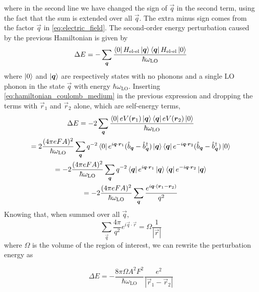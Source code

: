where in the second line we have changed the sign of $\vec{q}$ in the second term, using the fact that the sum is extended over all $\vec{q}$. The extra minus sign comes from the factor $\vec{q}$ in \cref{eq:electric_field}. The second-order energy perturbation caused by the previous Hamiltonian is given by
\begin{equation}
    \Delta E = -\sum_{\mathbf{\boldsymbol{q}}} \frac{\bra{0}H_\text{el-el}\ket{\mathbf{\boldsymbol{q}}}\bra{\mathbf{\boldsymbol{q}}}H_\text{el-el}\ket{0}}{\hbar\omega_\text{LO}}
\end{equation}
where $\ket{0}$ and $\ket{\mathbf{\boldsymbol{q}}}$ are respectively states with no phonons and a single LO phonon in the state $\vec{q}$ with energy $\hbar\omega_\text{LO}$. Inserting \cref{eq:hamiltonian_coulomb_medium} in the previous expression and dropping the terms with $\vec{r}_1$ and $\vec{r}_2$ alone, which are self-energy terms,
\begin{multline}
    \Delta E = -2\sum_{\mathbf{\boldsymbol{q}}} \frac{\bra{0}eV(\mathbf{\boldsymbol{r}}_1)\ket{\mathbf{\boldsymbol{q}}}\bra{\mathbf{\boldsymbol{q}}}eV(\mathbf{\boldsymbol{r}}_2)\ket{0}}{\hbar\omega_\text{LO}}
    \\ = 2 \frac{(4\pi eFA)^2}{\hbar \omega_\text{LO}} \sum_{\mathbf{\boldsymbol{q}}} q^{-2} \bra{0}e^{i\mathbf{\boldsymbol{q}}\cdot\mathbf{\boldsymbol{r}}_1}(\hat{b}_{\mathbf{\boldsymbol{q}}} - \hat{b}^\dagger_{\mathbf{\boldsymbol{q}}})\ket{\mathbf{\boldsymbol{q}}}\bra{\mathbf{\boldsymbol{q}}}e^{-i\mathbf{\boldsymbol{q}}\cdot\mathbf{\boldsymbol{r}}_2}(\hat{b}_{\mathbf{\boldsymbol{q}}} - \hat{b}^\dagger_{\mathbf{\boldsymbol{q}}})\ket{0}
    \\ = - 2 \frac{(4\pi eFA)^2}{\hbar \omega_\text{LO}} \sum_{\mathbf{\boldsymbol{q}}} q^{-2} \bra{\mathbf{\boldsymbol{q}}}e^{i\mathbf{\boldsymbol{q}}\cdot\mathbf{\boldsymbol{r}}_1}\ket{\mathbf{\boldsymbol{q}}}\bra{\mathbf{\boldsymbol{q}}}e^{-i\mathbf{\boldsymbol{q}}\cdot\mathbf{\boldsymbol{r}}_2}\ket{\mathbf{\boldsymbol{q}}}
    \\ = - 2 \frac{(4\pi eFA)^2}{\hbar \omega_\text{LO}} \sum_{\mathbf{\boldsymbol{q}}}\frac{e^{i\mathbf{\boldsymbol{q}}\cdot(\mathbf{\boldsymbol{r}}_1 - \mathbf{\boldsymbol{r}}_2)}}{q^2}
\end{multline}
Knowing that, when summed over all $\vec{q}$,
\begin{equation}
    \sum_\vec{q} \frac{4\pi}{q^2} e^{i\vec{q}\cdot \vec{r}} = \Omega \frac{1}{|\vec{r}|}
\end{equation}
where $\Omega$ is the volume of the region of interest, we can rewrite the perturbation energy as

\begin{equation}
    \Delta E = - \frac{8\pi \Omega A^2 F^2}{\hbar \omega_\text{LO}} \frac{e^2}{|\vec{r}_1 - \vec{r}_2|}
\end{equation}

